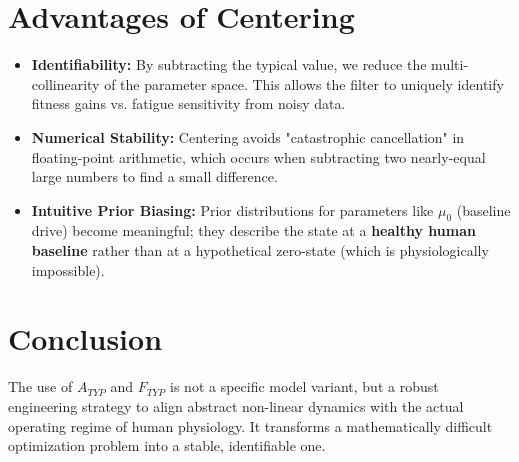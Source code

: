 \documentclass[11pt,a4paper]{article}
\begin{document}
\section{Advantages of Centering}

\begin{itemize}
    \item \textbf{Identifiability:} By subtracting the typical value, we reduce the multi-collinearity of the parameter space. This allows the filter to uniquely identify fitness gains vs. fatigue sensitivity from noisy data.
    \item \textbf{Numerical Stability:} Centering avoids "catastrophic cancellation" in floating-point arithmetic, which occurs when subtracting two nearly-equal large numbers to find a small difference.
    \item \textbf{Intuitive Prior Biasing:} Prior distributions for parameters like $\mu_0$ (baseline drive) become meaningful; they describe the state at a \textbf{healthy human baseline} rather than at a hypothetical zero-state (which is physiologically impossible).
\end{itemize}

\section{Conclusion}
The use of $A_{TYP}$ and $F_{TYP}$ is not a specific model variant, but a robust engineering strategy to align abstract non-linear dynamics with the actual operating regime of human physiology. It transforms a mathematically difficult optimization problem into a stable, identifiable one.
\end{document}
